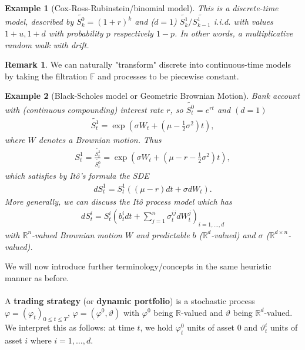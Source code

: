 \documentclass[12pt,a4paper, twoside]{article}
\newtheorem{exmp}{Example}[section]
\theoremstyle{definition}
\newtheorem{rem}{Remark}[section]
\begin{document}
\begin{exmp}[Cox-Ross-Rubinstein/binomial model] This is a discrete-time model, described by $\widetilde{S_k^0 }=(1+r)^k$ and ($d=1$) $\widetilde{S_k^1}/\widetilde{S_{k-1}^1}$ i.i.d. with values $1+u,1+d$ with probability $p$ respectively $1-p$. In other words, a multiplicative random walk with drift. 
\end{exmp}

\begin{rem} We can naturally "transform" discrete into continuous-time models by taking the filtration $\mathbb{F}$ and processes to be piecewise constant. 
\end{rem}

\begin{exmp}[Black-Scholes model or Geometric Brownian Motion] Bank account with (continuous compounding) interest rate $r$, so $\widetilde{S_t^0}=e^{rt}$ and $(d=1)$ 
\begin{align*}
\widetilde{S_t^1} = \exp \left( \sigma W_t + \left( \mu - \frac{1}{2} \sigma^2 \right) t \right),
\end{align*}
where $W$ denotes a Brownian motion. Thus
\begin{align*}
S_t^1 = \frac{\widetilde{S_t^1}}{\widetilde{S_t^0}} = \exp \left( \sigma W_t + \left( \mu - r - \frac{1}{2} \sigma^2\right)t \right),
\end{align*}
which satisfies by Itô's formula the SDE 
\begin{align*}
d S_t^1 = S_t^1 (( \mu-r)dt + \sigma dW_t).
\end{align*}
More generally, we can discuss the Itô process model which has
\begin{align*}
dS_t^i = S_t^i \left( b_t^i dt + \sum_{j=1}^n \sigma_t^{ij} d W_t^j \right)_{i=1, \dots , d} 
\end{align*}
with $\mathbb{R}^n$-valued Brownian motion $W$ and predictable $b$ ($\mathbb{R}^d$-valued) and $\sigma$ ($\mathbb{R}^{d \times n}$-valued). 
\end{exmp}
\newpage
We will now introduce further terminology/concepts in the same heuristic manner as before. 
\\\\
A \textbf{trading strategy} (or \textbf{dynamic portfolio}) is a stochastic process $\varphi = (\varphi_t)_{0 \leq t \leq T}$, $\varphi=( \varphi^0 , \vartheta)$ with $\varphi^0$ being $\mathbb{R}$-valued and $\vartheta$ being $\mathbb{R}^d$-valued. We interpret this as follows: at time $t$, we hold $\varphi_t^0$ units of asset $0$ and $\vartheta_t^i$ units of asset $i$ where $i=1, \dots , d$. 
\end{document}
